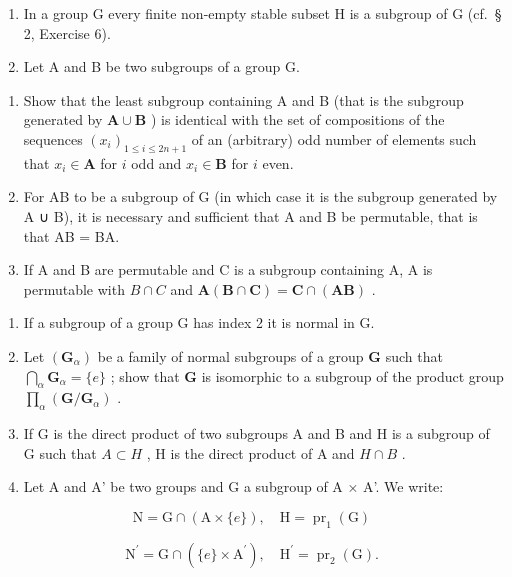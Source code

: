 \begin{enumerate}
\def\labelenumi{\arabic{enumi}.}
\setcounter{enumi}{2}
\item
  In a group G every finite non-empty stable subset H is a subgroup of G (cf.~§ 2, Exercise 6).
\item
  Let A and B be two subgroups of a group G.
\end{enumerate}

\begin{enumerate}
\def\labelenumi{(\alph{enumi})}
\item
  Show that the least subgroup containing A and B (that is the subgroup generated by \(\mathbf{A} \cup \mathbf{B}\) ) is identical with the set of compositions of the sequences \((x_{i})_{1 \leqslant i \leqslant 2n + 1}\) of an (arbitrary) odd number of elements such that \(x_{i} \in \mathbf{A}\) for \(i\) odd and \(x_{i} \in \mathbf{B}\) for \(i\) even.
\item
  For AB to be a subgroup of G (in which case it is the subgroup generated by A ∪ B), it is necessary and sufficient that A and B be permutable, that is that AB = BA.
\item
  If A and B are permutable and C is a subgroup containing A, A is permutable with \(B \cap C\) and \(\mathbf{A}(\mathbf{B} \cap \mathbf{C}) = \mathbf{C} \cap (\mathbf{AB})\) .
\end{enumerate}

\begin{enumerate}
\def\labelenumi{\arabic{enumi}.}
\setcounter{enumi}{4}
\item
  If a subgroup of a group G has index 2 it is normal in G.
\item
  Let \((\mathbf{G}_{\alpha})\) be a family of normal subgroups of a group \(\mathbf{G}\) such that \(\bigcap_{\alpha} \mathbf{G}_{\alpha} = \{e\}\) ; show that \(\mathbf{G}\) is isomorphic to a subgroup of the product group \(\prod_{\alpha} (\mathbf{G} / \mathbf{G}_{\alpha})\) .
\item
  If G is the direct product of two subgroups A and B and H is a subgroup of G such that \(A \subset H\) , H is the direct product of A and \(H \cap B\) .
\item
  Let A and A' be two groups and G a subgroup of A × A'. We write:
\end{enumerate}

\[
\mathrm{N} = \mathrm{G} \cap (\mathrm{A} \times \{e \}), \quad \mathrm{H} = \operatorname{pr} _ {1} (\mathrm{G})
\]

\[
\mathrm{N} ^ {\prime} = \mathrm{G} \cap (\{e \} \times \mathrm{A} ^ {\prime}), \quad \mathrm{H} ^ {\prime} = \operatorname{pr} _ {2} (\mathrm{G}).
\]

